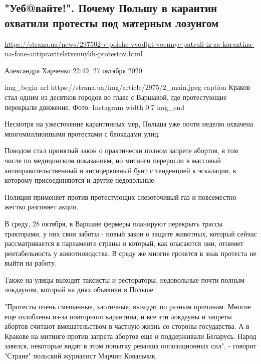  
 

\subsection{"Уеб@вайте!". Почему Польшу в карантин охватили протесты под матерным лозунгом}

\url{https://strana.ua/news/297502-v-polshe-vvodjat-voennye-patruli-iz-za-karantina-na-fone-antipravitelstvennykh-protestov.html}

Александра Харченко 22:49, 27 октября 2020 

\ifcmt
img_begin 
  url https://strana.ua/img/article/2975/2_main.jpeg
  caption Краков стал одним из десятков городов во главе с Варшавой, где протестующие перекрыли движение. Фото: Instagram 
  width 0.7
img_end
\fi

Несмотря на ужесточение карантинных мер, Польша уже почти неделю охвачена
многомиллионными протестами с блокадами улиц.

Поводом стал принятый закон о практически полном запрете абортов, в том числе
по медицинским показаниям, но митинги переросли в массовый
антиправительственный и антицерковный бунт с тенденцией к эскалации, к которому
присоединяются и другие недовольные. 

Полиция применяет против протестующих слезоточивый газ и повсеместно жестко
разгоняет акции.

В среду, 28 октября, в Варшаве фермеры планируют перекрыть трассы тракторами, у
них свои заботы - новый закон о защите животных, который сейчас рассматривается
в парламенте страны и который, как опасаются они, отнимет рентабельность у
животноводства. В среду же многие грозятся в знак протеста не выйти на работу.

Также на улицы выходят таксисты и рестораторы, недовольные почти полным
локдауном, который на днях объявили в Польше.

"Протесты очень смешанные, хаотичные, выходят по разным причинам. Многие еще
озлоблены из-за повторного карантина, и все эти локдауны и запреты абортов
считают вмешательством в частную жизнь со стороны государства. А в Кракове на
митинге против запрета абортов еще и поддерживали Беларусь. Народ завелся,
некоторые видят в этом попытку реванша оппозиционных сил", - говорит "Стране"
польский журналист Марчин Ковальчик.   


